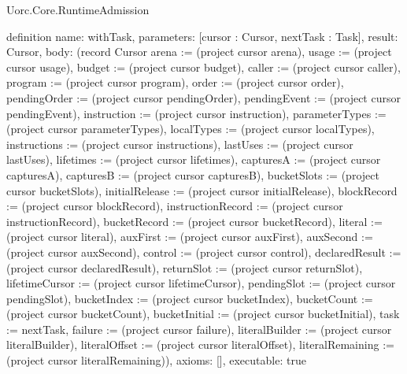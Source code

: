 \begin{lexlean}{Uorc.Core.RuntimeAdmission}
\begin{semanticmodule}
definition{
  name: withTask,
  parameters: [cursor : Cursor, nextTask : Task],
  result: Cursor,
  body: (record Cursor {arena := (project cursor arena), usage := (project cursor usage), budget := (project cursor budget), caller := (project cursor caller), program := (project cursor program), order := (project cursor order), pendingOrder := (project cursor pendingOrder), pendingEvent := (project cursor pendingEvent), instruction := (project cursor instruction), parameterTypes := (project cursor parameterTypes), localTypes := (project cursor localTypes), instructions := (project cursor instructions), lastUses := (project cursor lastUses), lifetimes := (project cursor lifetimes), capturesA := (project cursor capturesA), capturesB := (project cursor capturesB), bucketSlots := (project cursor bucketSlots), initialRelease := (project cursor initialRelease), blockRecord := (project cursor blockRecord), instructionRecord := (project cursor instructionRecord), bucketRecord := (project cursor bucketRecord), literal := (project cursor literal), auxFirst := (project cursor auxFirst), auxSecond := (project cursor auxSecond), control := (project cursor control), declaredResult := (project cursor declaredResult), returnSlot := (project cursor returnSlot), lifetimeCursor := (project cursor lifetimeCursor), pendingSlot := (project cursor pendingSlot), bucketIndex := (project cursor bucketIndex), bucketCount := (project cursor bucketCount), bucketInitial := (project cursor bucketInitial), task := nextTask, failure := (project cursor failure), literalBuilder := (project cursor literalBuilder), literalOffset := (project cursor literalOffset), literalRemaining := (project cursor literalRemaining)}),
  axioms: [],
  executable: true
}


\end{semanticmodule}
\end{lexlean}

